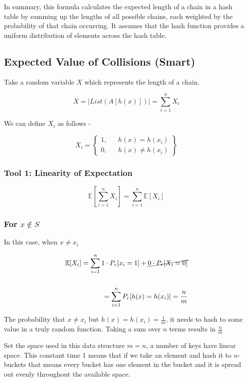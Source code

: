 \documentclass{article}
\begin{document}
In summary, this formula calculates the expected length of a chain in a hash table by summing up the lengths of all possible chains, each weighted by the probability of that chain occurring. It assumes that the hash function provides a uniform distribution of elements across the hash table.

\subsection{Expected Value of Collisions (Smart)}

Take a random variable $X$ which represents the length of a chain.

$$
X = |List(A[h(x)])| = \sum^{n}_{i=1} X_i
$$

We can define $X_i$ as follows - 

$$
X_i = \left\{ \begin{matrix} 1, && h(x) = h(x_i) \\ 0, && h(x) \neq h(x_i) \end{matrix}\right\}
$$

\subsubsection{Tool 1: Linearity of Expectation}

$$
\mathbb E[\sum^{n}_{i=1} X_i] = \sum^{n}_{i=1} \mathbb E[X_i]
$$

\subsubsection{For $x \notin S$}

In this case, when $x \neq x_i$

\begin{align*}
    \mathbb E[X_i] = \sum^{n}_{i=1} 1 \cdot P_r[x_i = 1] + \cancel{0 \cdot P_r[X_i = 0]} \\ \\
    = \sum^{n}_{i=1} P_r[h(x) = h(x_i)]
    = \frac{n}{m}
\end{align*}

The probability that $x \neq x_i$ but $h(x) = h(x_i) = \frac{1}{m}$, it needs to hash to some value in a truly random function. Taking a sum over $n$ terms results in $\frac{n}{m}$

Set the space used in this data structure $m = n$, a number of keys have linear space. This constant time 1 means that if we take an element and hash it to $n$-buckets that means every bucket has one element in the bucket and it is spread out evenly throughout the available space.
\end{document}
